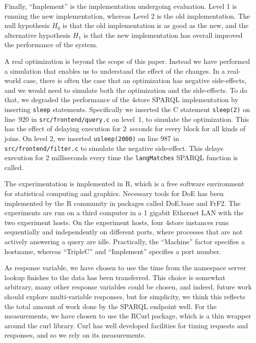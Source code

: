 \documentclass{llncs}
\begin{document}
Finally, ``Implement'' is the implementation undergoing
evaluation. Level 1 is running the new implementation, whereas Level 2
is the old implementation. The null hypothesis $H_0$ is that the old
implementation is as good as the new, and the alternative hypothesis
$H_1$ is that the new implementation has overall improved the
performance of the system.

A real optimization is beyond the scope of this paper. Instead we have
performed a simulation that enables us to understand the effect of the
changes.  In a real-world case, there is often the case that an
optimization has negative side-effects, and we would need to simulate
both the optimization and the side-effects. To do that, we degraded
the performance of the 4store SPARQL implementation by inserting
\texttt{sleep} statements. Specifically we inserted the C statement
\texttt{sleep(2)} on line~920 in \texttt{src/frontend/query.c} on
level~1, to simulate the optimization. This has the effect of delaying
execution for 2~seconds for every block for all kinds of joins. On
level 2, we inserted \texttt{usleep(2000)} on line 987 in
\texttt{src/frontend/filter.c} to simulate the negative
side-effect. This delays execution for 2 milliseconds every time the
\texttt{langMatches} SPARQL function is called.

The experimentation is implemented in R\cite{rmanual}, which is a free
software environment for statistical computing and graphics. Necessary
tools for DoE has been implemented by the R community in packages
called DoE.base\cite{doebase} and FrF2\cite{frf2}. The experiments are
run on a third computer in a 1 gigabit Ethernet LAN with the two
experiment hosts. On the experiment hosts, four 4store instances runs
sequentially and independently on different ports, where processes
that are not actively answering a query are idle. Practically, the
``Machine'' factor specifies a hostname, whereas ``TripleC'' and
``Implement'' specifies a port number.

As response variable, we have chosen to use the time from the
namespace server lookup finishes to the data has been
transferred. This choice is somewhat arbitrary, many other response
variables could be chosen, and indeed, future work should explore
multi-variable responses, but for simplicity, we think this reflects
the total amount of work done by the SPARQL endpoint well. For the
measurements, we have chosen to use the RCurl package\cite{lang2007r},
which is a thin wrapper around the curl library. Curl has well
developed facilities for timing requests and responses, and so we rely
on its measurements.
\end{document}
